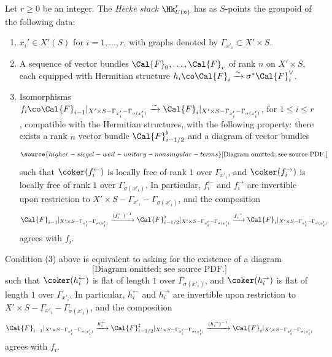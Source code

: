 \begin{defn}
\notready\label{defn: Hk U(n)}
Let $r \geq 0$ be an integer. The \emph{Hecke stack} $\Hk_{U(n)}^{r}$ has as $S$-points the groupoid of the following data:
\begin{enumerate}
\item $x_i' \in X'(S)$ for $i = 1, \ldots, r$, with graphs denoted by $\Gamma_{x'_i} \subset X' \times S$.
\item A sequence of vector bundles $\Cal{F}_0, \ldots, \Cal{F}_r$ of rank $n$ on $X' \times S$, each equipped with Hermitian structure $h_i \co \Cal{F}_i \xrightarrow{\sim} \sigma^* \Cal{F}_i^{\vee}$.
\item Isomorphisms $f_i \co \Cal{F}_{i-1}|_{X' \times S - \Gamma_{x'_i} - \Gamma_{\sigma(x'_i)}} \xrightarrow{\sim} \Cal{F}_i|_{X' \times S - \Gamma_{x'_i}-\Gamma_{\sigma(x'_i)}}$, for $1 \leq i \leq r$, compatible with the Hermitian structures, with the following property: there exists a rank $n$ vector bundle $\Cal{F}^{\flat}_{i-1/2}$ and a diagram of vector bundles
\begin{equation}\label{eq: modification diagram 1}
\source{higher-siegel-weil-unitary-nonsingular-terms}
\text{[Diagram omitted; see source PDF.]}
\end{equation}
such that $\coker(f_i^{\leftarrow})$ is locally free of rank $1$ over $\Gamma_{x'_i}$, and $\coker(f_i^{\rightarrow})$ is locally free of rank $1$ over $\Gamma_{\sigma(x'_i)}$. In particular, $f_i^{\leftarrow}$ and $f_i^{\rightarrow}$ are invertible upon restriction to $X' \times S - \Gamma_{x'_i}-\Gamma_{\sigma(x'_i)}$, and the composition
\[
\Cal{F}_{i-1}|_{X' \times S - \Gamma_{x'_i}-\Gamma_{\sigma(x'_i)}} \xrightarrow{(f_i^{\leftarrow})^{-1}} \Cal{F}_{i-1/2}^{\flat}|_{X' \times S - \Gamma_{x'_i}-\Gamma_{\sigma(x'_i)}} \xrightarrow{f_i^{\rightarrow}} \Cal{F}_{i} |_{X' \times S - \Gamma_{x'_i}-\Gamma_{\sigma(x'_i)}}
\]
agrees with $f_i$.
\end{enumerate}


\end{defn}

\begin{remark}
\notready\label{rem: formulation of upper/lower}
Condition (3) above is equivalent to asking for the existence of a diagram
\[
\text{[Diagram omitted; see source PDF.]}
\]
such that $\coker(h_i^{\leftarrow})$ is flat of length $1$ over $\Gamma_{\sigma(x'_i)}$, and $\coker(h_i^{\rightarrow})$ is flat of length $1$ over $\Gamma_{x'_i}$. In particular, $h_i^{\leftarrow}$ and $h_i^{\rightarrow}$ are invertible upon restriction to $X' \times S - \Gamma_{x'_i}-\Gamma_{\sigma(x'_i)}$, and the composition
\[
\Cal{F}_{i-1}|_{X' \times S - \Gamma_{x'_i}-\Gamma_{\sigma(x'_i)}} \xrightarrow{h_i^{\leftarrow}} \Cal{F}_{i-1/2}^{\sharp}|_{X' \times S - \Gamma_{x'_i}-\Gamma_{\sigma(x'_i)}} \xrightarrow{(h_i^{\rightarrow})^{-1}} \Cal{F}_{i} |_{X' \times S - \Gamma_{x'_i}-\Gamma_{\sigma(x'_i)}}
\]
agrees with $f_i$.
\end{remark}


